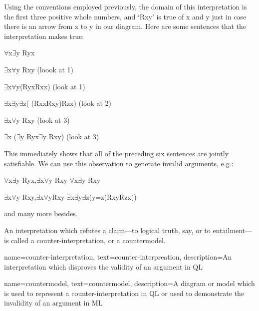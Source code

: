Using the conventions employed previously, the domain of this interpretation is the first three positive whole numbers, and ‘Rxy’ is true of x and y just in case there is an arrow from x to y in our diagram. Here are some sentences that the interpretation makes true:
\begin{earg}
\item[]$\forall$x$\exists$y Ryx
\item[]$\exists$x$\forall$y Rxy (loook at 1)
\item[]$\exists$x$\forall$y(Ryx\eiff Rxx)  (look at 1)
\item[]$\exists$x$\exists$y$\exists$z( (\enot Rxx\eand Rxy)\eand Rzx) (look at 2)
\item[]$\exists$x$\forall$y \enot Rxy (look at 3)
\item[]$\exists$x ($\exists$y Ryx\eand \enot $\exists$y Rxy) (look at 3)
\end{earg}
This immediately shows that all of the preceding six sentences are jointly satisfiable. We can use this observation to generate invalid arguments, e.g.:
\begin{earg}
\item[]$\forall$x$\exists$y Ryx,$\exists$x$\forall$y Rxy \therefore $\forall$x$\exists$y Rxy
\item[]$\exists$x$\forall$y Rxy,$\exists$x$\forall$y\enot Rxy \therefore \enot $\exists$x$\exists$y$\exists$z(\enot y=z\eand (Rxy\eand Rzx))
\item[]and many more besides.
\end{earg}

An interpretation which refutes a claim—to logical truth, say, or to entailment—is called a \gls{counter-interpretation}, or a \gls{countermodel}.

{
name={counter-interpretation},
text={counter-interpreation},
description={An interpretation which disproves the validity of an argument in QL}
}

{
name={countermodel},
text={countermodel},
description={A diagram or model which is used to represent a counter-interpretation in QL or used to demonstrate the invalidity of an argument in ML}
}


